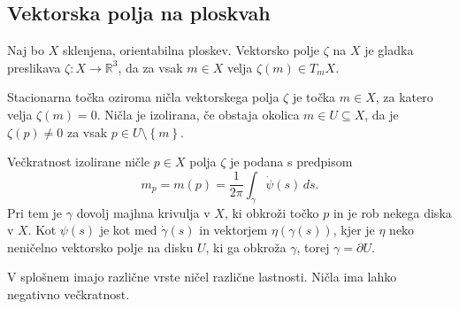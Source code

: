 \subsection{Vektorska polja na ploskvah} 

\begin{definicija}
\label{def_vektorsko_polje}
Naj bo $X$ sklenjena, orientabilna ploskev. Vektorsko polje $\zeta$ na $X$ je gladka preslikava $\zeta: X \to  \mathbb{R}^3$, da za vsak $m \in  X$ velja $\zeta(m) \in  T_mX$.
\end{definicija}

\begin{definicija}
\label{def_stacionarna_tocka_vektorskega_polja}
Stacionarna točka oziroma ničla vektorskega polja $\zeta$ je točka $m \in  X$, za katero velja $\zeta(m) = 0$. Ničla je izolirana, če obstaja okolica $m \in  U \subseteq X$, da je $\zeta(p) \neq 0$ za vsak $p \in  U \setminus \left\{ m\right\} $.
\end{definicija}

\begin{definicija}
\label{def_veckratnost_izolirane_nicle}
Večkratnost izolirane ničle $p \in  X$ polja $\zeta$ je podana s predpisom \begin{equation*}
m_p = m(p) = \frac{1}{2\pi} \int_{\gamma} \dot{\psi}(s) \, ds. 
\end{equation*}  
Pri tem je $\gamma$ dovolj majhna krivulja v $X$, ki obkroži točko $p$ in je rob nekega diska v $X$. Kot $\psi(s)$ je kot med
$\dot{\gamma}(s)$ in vektorjem $\eta(\gamma(s))$, kjer je $\eta$ neko neničelno vektorsko polje na disku $U$, ki ga obkroža $\gamma$, torej $\gamma = \partial U$.  
\end{definicija}

\begin{opomba}
    V splošnem imajo različne vrste ničel različne lastnosti. Ničla ima lahko negativno večkratnost.
    \end{opomba}

